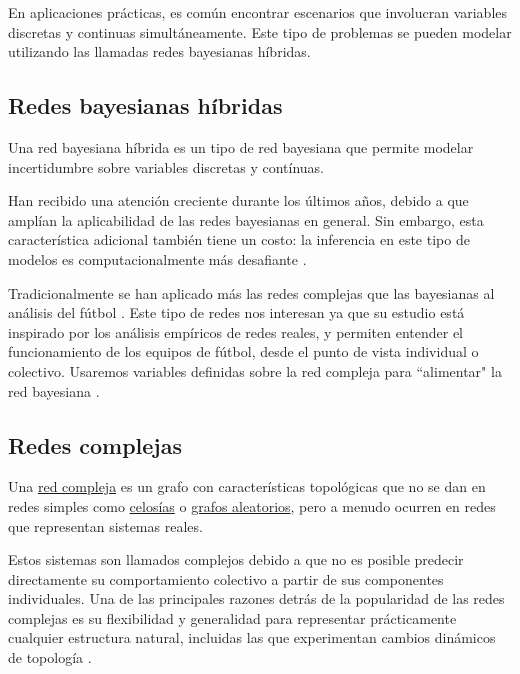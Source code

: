 En aplicaciones prácticas, es común encontrar escenarios que
involucran variables discretas y continuas simultáneamente. Este tipo de problemas se pueden modelar 
utilizando las llamadas redes bayesianas híbridas.

\subsection{Redes bayesianas híbridas}
\begin{definicion} \label{def:hybrid_BN}
    Una red bayesiana híbrida \cite{hybrid-BN} es un tipo de red bayesiana que permite modelar incertidumbre
    sobre variables discretas y contínuas.
\end{definicion}

Han recibido una atención creciente durante 
los últimos años, debido a que amplían la aplicabilidad de las redes bayesianas en general. Sin embargo, 
esta característica adicional también tiene un costo: la inferencia
en este tipo de modelos es computacionalmente más desafiante \cite{inference-rev-hbn}.

Tradicionalmente se han aplicado más las redes complejas que las bayesianas al análisis del fútbol \cite{ARRIAZAARDILES2018236}.
Este tipo de redes nos interesan ya que su estudio está inspirado por los análisis empíricos de redes reales, y 
permiten entender el funcionamiento de los equipos de fútbol, desde el punto de vista individual o colectivo. Usaremos 
variables definidas sobre la red compleja para ``alimentar" la red bayesiana \cite{Bai_Xing_Wu_2022}.

\subsection{Redes complejas}
\begin{definicion} \label{def:CN}
    Una \href{https://en.wikipedia.org/wiki/Complex_network}{red compleja} 
    es un grafo con características topológicas que no se dan 
    en redes simples como \href{https://en.wikipedia.org/wiki/Lattice_(order)}{celosías} o 
    \href{https://mathworld.wolfram.com/RandomGraph.html}{grafos aleatorios}, pero a menudo ocurren en redes que 
    representan sistemas reales. 
\end{definicion}

Estos sistemas son llamados complejos debido a que no es posible predecir directamente su 
comportamiento colectivo a partir de sus componentes individuales. Una de las principales razones detrás de 
la popularidad de las redes complejas es su flexibilidad
y generalidad para representar prácticamente cualquier estructura natural, incluidas las que experimentan 
cambios dinámicos de topología \cite{CN-review}.

